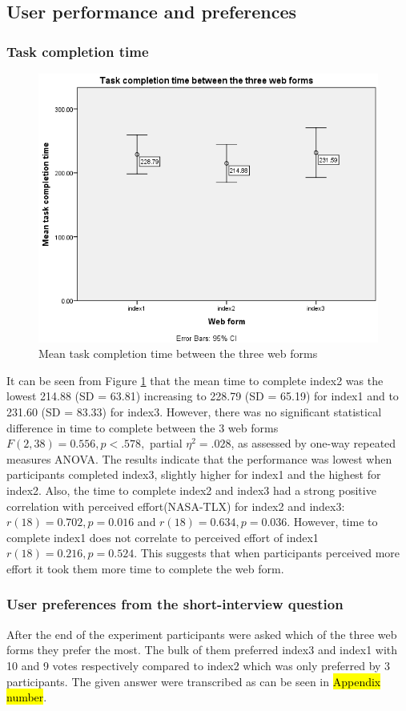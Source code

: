 \documentclass[a4paper]{report}
\begin{document}
		\subsection{User performance and preferences}
			\subsubsection{Task completion time}		
			\begin{figure}[h]
				\centering
				\includegraphics[width=0.85\linewidth]{mean-task-completion-time}
				\caption[Task completion time between the three web forms]{Mean task completion time between the three web forms}
				\label{fig:mean-task-completion-time}
			\end{figure}
			It can be seen from Figure \ref{fig:mean-task-completion-time} that the mean time to complete index2 was the lowest 214.88 (SD = 63.81) increasing to 228.79 (SD = 65.19) for index1 and to 231.60 (SD = 83.33) for index3. However, there was no significant statistical difference in time to complete between the 3 web forms $F(2,38)=0.556, p<.578,$ partial $\eta^{2}=.028$, as assessed by one-way repeated measures ANOVA. The results indicate that the performance was lowest when participants completed index3, slightly higher for index1 and the highest for index2.
			Also, the time to complete index2 and index3 had a strong positive correlation with perceived effort(NASA-TLX) for index2 and index3: $r(18)=0.702, p=0.016$ and $r(18)=0.634, p=0.036$. However, time to complete index1 does not correlate to perceived effort of index1 $r(18)=0.216, p=0.524$. This suggests that when participants perceived more effort it took them more time to complete the web form.
			\subsubsection{User preferences from the short-interview question}
			After the end of the experiment participants were asked which of the three web forms they prefer the most. The bulk of them preferred index3 and index1 with 10 and 9 votes respectively compared to index2 which was only preferred by 3 participants. The given answer were transcribed as can be seen in \hl{Appendix number}. 
\end{document}
